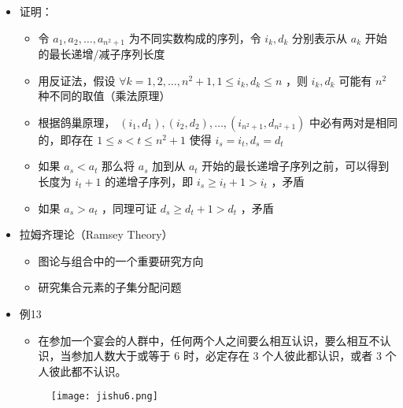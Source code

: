 \documentclass[UTF8]{report}
\theoremstyle{MyLineTheoremStyle} %
\theoremstyle{MyBlockTheoremStyle} %
\theoremstyle{MySubsubsectionStyle} %
\begin{document}
\begin{itemize}
    \item 证明：
    \begin{itemize}
        \item 令 $a_1, a_2, \ldots , a_{n^2+1}$ 为不同实数构成的序列，令 $i_k, d_k$ 分别表示从 $a_k$ 开始的最长递增/减子序列长度
        \item 用反证法，假设 $\forall k = 1,2, \ldots , n^2 + 1, 1 \leq i_k, d_k \leq n$ ，则 $i_k, d_k$ 可能有 $n^2$ 种不同的取值（乘法原理）
        \item 根据鸽巢原理， $(i_1, d_1) , (i_2, d_2) , \ldots , (i_{n^2+1}, d_{n^2+1})$ 中必有两对是相同的，即存在 $1 \leq s < t \leq n^2 + 1$ 使得 $i_s = i_t, d_s = d_t$
        \item 如果 $a_s < a_t$ 那么将 $a_s$ 加到从 $a_t$ 开始的最长递增子序列之前，可以得到长度为 $i_t + 1$ 的递增子序列，即 $i_s \geq i_t + 1 > i_t$ ，矛盾
        \item 如果 $a_s > a_t$ ，同理可证 $d_s \geq d_t + 1 > d_t$ ，矛盾
    \end{itemize}
    \item 拉姆齐理论（Ramsey Theory）
    \begin{itemize}
        \item 图论与组合中的一个重要研究方向
        \item 研究集合元素的子集分配问题
    \end{itemize}
    \item 例13
    \begin{itemize}
        \item 在参加一个宴会的人群中，任何两个人之间要么相互认识，要么相互不认识，当参加人数大于或等于 6 时，必定存在 3 个人彼此都认识，或者 3 个人彼此都不认识。
    \end{itemize}

    \begin{figure}[H]
        \centering
        \texttt{[image: jishu6.png]}
    \end{figure}


\end{itemize}
\end{document}
